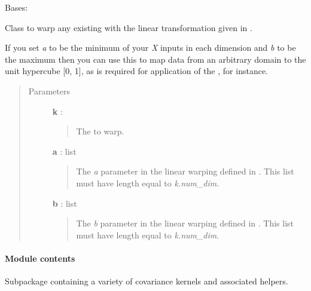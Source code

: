 \documentclass[letterpaper,10pt,english]{sphinxmanual}
\begin{document}
\begin{fulllineitems}
\label{gptools.kernel:gptools.kernel.warping.LinearWarpedKernel}
Bases: {\hyperref[gptools.kernel:gptools.kernel.warping.WarpedKernel]{}}

Class to warp any existing  with the linear transformation given in {\hyperref[gptools.kernel:gptools.kernel.warping.linear_warp]{}}.

If you set \emph{a} to be the minimum of your \emph{X} inputs in each dimension and \emph{b}
to be the maximum then you can use this to map data from an arbitrary domain
to the unit hypercube {[}0, 1{]}, as is required for application of the
{\hyperref[gptools.kernel:gptools.kernel.warping.BetaWarpedKernel]{}}, for instance.
\begin{quote}\begin{description}
\item[{Parameters}] \leavevmode
\textbf{k} : 
\begin{quote}

The  to warp.
\end{quote}

\textbf{a} : list
\begin{quote}

The \emph{a} parameter in the linear warping defined in {\hyperref[gptools.kernel:gptools.kernel.warping.linear_warp]{}}.
This list must have length equal to \emph{k.num\_dim}.
\end{quote}

\textbf{b} : list
\begin{quote}

The \emph{b} parameter in the linear warping defined in {\hyperref[gptools.kernel:gptools.kernel.warping.linear_warp]{}}.
This list must have length equal to \emph{k.num\_dim}.
\end{quote}

\end{description}\end{quote}

\end{fulllineitems}



\paragraph{Module contents}
\label{gptools.kernel:module-contents}\label{gptools.kernel:module-gptools.kernel}
Subpackage containing a variety of covariance kernels and associated helpers.
\end{document}
